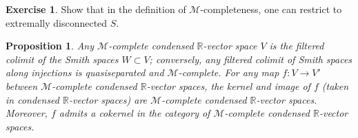 \documentclass[11pt]{amsbook}
\numberwithin{equation}{section}
\numberwithin{theorem}{section}
\newtheorem{proposition}[theorem]{Proposition}
\theoremstyle{definition}
\newtheorem{exercise}[theorem]{Exercise}
\begin{document}
\begin{exercise} Show that in the definition of $\mathcal M$-completeness, one can restrict to extremally disconnected $S$.
\end{exercise}

\begin{proposition} Any $\mathcal M$-complete condensed $\mathbb R$-vector space $V$ is the filtered colimit of the Smith spaces $W\subset V$; conversely, any filtered colimit of Smith spaces along injections is quasiseparated and $\mathcal M$-complete. For any map $f: V\to V'$ between $\mathcal M$-complete condensed $\mathbb R$-vector spaces, the kernel and image of $f$ (taken in condensed $\mathbb R$-vector spaces) are $\mathcal M$-complete condensed $\mathbb R$-vector spaces. Moreover, $f$ admits a cokernel in the category of $\mathcal M$-complete condensed $\mathbb R$-vector spaces.
\end{proposition}
\end{document}
